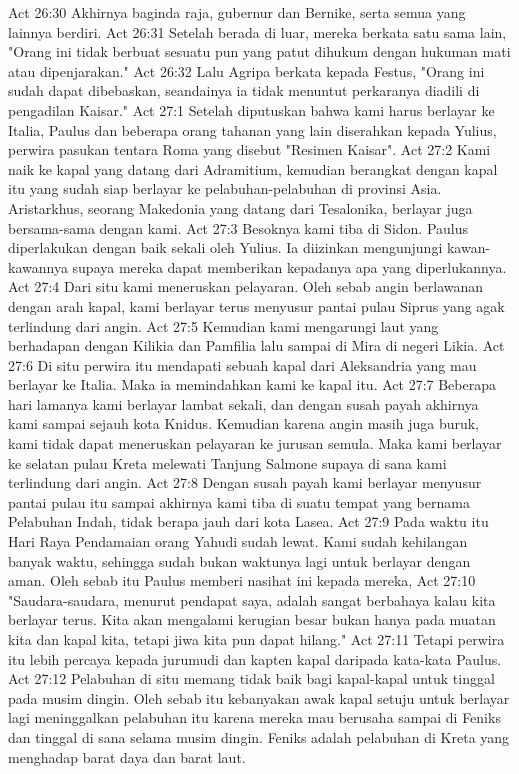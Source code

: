 Act 26:30  Akhirnya baginda raja, gubernur dan Bernike, serta semua yang lainnya berdiri.
Act 26:31  Setelah berada di luar, mereka berkata satu sama lain, "Orang ini tidak berbuat sesuatu pun yang patut dihukum dengan hukuman mati atau dipenjarakan."
Act 26:32  Lalu Agripa berkata kepada Festus, "Orang ini sudah dapat dibebaskan, seandainya ia tidak menuntut perkaranya diadili di pengadilan Kaisar."
Act 27:1  Setelah diputuskan bahwa kami harus berlayar ke Italia, Paulus dan beberapa orang tahanan yang lain diserahkan kepada Yulius, perwira pasukan tentara Roma yang disebut "Resimen Kaisar".
Act 27:2  Kami naik ke kapal yang datang dari Adramitium, kemudian berangkat dengan kapal itu yang sudah siap berlayar ke pelabuhan-pelabuhan di provinsi Asia. Aristarkhus, seorang Makedonia yang datang dari Tesalonika, berlayar juga bersama-sama dengan kami.
Act 27:3  Besoknya kami tiba di Sidon. Paulus diperlakukan dengan baik sekali oleh Yulius. Ia diizinkan mengunjungi kawan-kawannya supaya mereka dapat memberikan kepadanya apa yang diperlukannya.
Act 27:4  Dari situ kami meneruskan pelayaran. Oleh sebab angin berlawanan dengan arah kapal, kami berlayar terus menyusur pantai pulau Siprus yang agak terlindung dari angin.
Act 27:5  Kemudian kami mengarungi laut yang berhadapan dengan Kilikia dan Pamfilia lalu sampai di Mira di negeri Likia.
Act 27:6  Di situ perwira itu mendapati sebuah kapal dari Aleksandria yang mau berlayar ke Italia. Maka ia memindahkan kami ke kapal itu.
Act 27:7  Beberapa hari lamanya kami berlayar lambat sekali, dan dengan susah payah akhirnya kami sampai sejauh kota Knidus. Kemudian karena angin masih juga buruk, kami tidak dapat meneruskan pelayaran ke jurusan semula. Maka kami berlayar ke selatan pulau Kreta melewati Tanjung Salmone supaya di sana kami terlindung dari angin.
Act 27:8  Dengan susah payah kami berlayar menyusur pantai pulau itu sampai akhirnya kami tiba di suatu tempat yang bernama Pelabuhan Indah, tidak berapa jauh dari kota Lasea.
Act 27:9  Pada waktu itu Hari Raya Pendamaian orang Yahudi sudah lewat. Kami sudah kehilangan banyak waktu, sehingga sudah bukan waktunya lagi untuk berlayar dengan aman. Oleh sebab itu Paulus memberi nasihat ini kepada mereka,
Act 27:10  "Saudara-saudara, menurut pendapat saya, adalah sangat berbahaya kalau kita berlayar terus. Kita akan mengalami kerugian besar bukan hanya pada muatan kita dan kapal kita, tetapi jiwa kita pun dapat hilang."
Act 27:11  Tetapi perwira itu lebih percaya kepada jurumudi dan kapten kapal daripada kata-kata Paulus.
Act 27:12  Pelabuhan di situ memang tidak baik bagi kapal-kapal untuk tinggal pada musim dingin. Oleh sebab itu kebanyakan awak kapal setuju untuk berlayar lagi meninggalkan pelabuhan itu karena mereka mau berusaha sampai di Feniks dan tinggal di sana selama musim dingin. Feniks adalah pelabuhan di Kreta yang menghadap barat daya dan barat laut.
